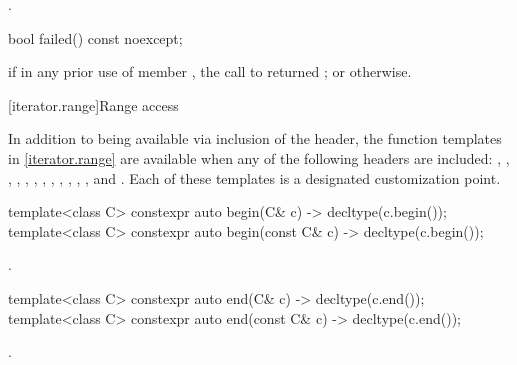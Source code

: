 \begin{itemdescr}
\pnum
\returns
{}.
\end{itemdescr}

%
\begin{itemdecl}
bool failed() const noexcept;
\end{itemdecl}

\begin{itemdescr}
\pnum
\returns
{}
if in any prior use of member
,
the call to
returned
;
or
otherwise.
\end{itemdescr}

[iterator.range]{Range access}

\pnum
In addition to being available via inclusion of the  header,
the function templates in \ref{iterator.range} are available when any of the following
headers are included:
,
,
,
,
,
,
,
,
,
,
,
, and
.
Each of these templates
is a designated customization point.

%
\begin{itemdecl}
template<class C> constexpr auto begin(C& c) -> decltype(c.begin());
template<class C> constexpr auto begin(const C& c) -> decltype(c.begin());
\end{itemdecl}

\begin{itemdescr}
\pnum
\returns
{}.
\end{itemdescr}

%
\begin{itemdecl}
template<class C> constexpr auto end(C& c) -> decltype(c.end());
template<class C> constexpr auto end(const C& c) -> decltype(c.end());
\end{itemdecl}

\begin{itemdescr}
\pnum
\returns
{}.
\end{itemdescr}

